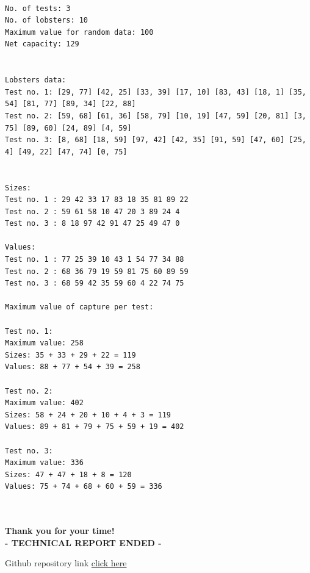 \documentclass{article}%
\begin{document}
\small
\begin{verbatim}                     
    
No. of tests: 3
No. of lobsters: 10
Maximum value for random data: 100
Net capacity: 129


Lobsters data:
Test no. 1: [29, 77] [42, 25] [33, 39] [17, 10] [83, 43] [18, 1] [35, 54] [81, 77] [89, 34] [22, 88] 
Test no. 2: [59, 68] [61, 36] [58, 79] [10, 19] [47, 59] [20, 81] [3, 75] [89, 60] [24, 89] [4, 59] 
Test no. 3: [8, 68] [18, 59] [97, 42] [42, 35] [91, 59] [47, 60] [25, 4] [49, 22] [47, 74] [0, 75] 


Sizes:
Test no. 1 : 29 42 33 17 83 18 35 81 89 22 
Test no. 2 : 59 61 58 10 47 20 3 89 24 4 
Test no. 3 : 8 18 97 42 91 47 25 49 47 0 

Values:
Test no. 1 : 77 25 39 10 43 1 54 77 34 88 
Test no. 2 : 68 36 79 19 59 81 75 60 89 59 
Test no. 3 : 68 59 42 35 59 60 4 22 74 75 

Maximum value of capture per test:

Test no. 1:
Maximum value: 258
Sizes: 35 + 33 + 29 + 22 = 119
Values: 88 + 77 + 54 + 39 = 258

Test no. 2:
Maximum value: 402
Sizes: 58 + 24 + 20 + 10 + 4 + 3 = 119
Values: 89 + 81 + 79 + 75 + 59 + 19 = 402

Test no. 3:
Maximum value: 336
Sizes: 47 + 47 + 18 + 8 = 120
Values: 75 + 74 + 68 + 60 + 59 = 336
    
                        
    \end{verbatim}                    
\vspace*{\fill}
%
\newpage%

        \vspace*{\fill}
        \begin{center}
            \LARGE \textbf{Thank you for your time!} \\
            \LARGE \textbf{- TECHNICAL REPORT ENDED -}
        \end{center}
                 
        \vspace*{\fill}
Github repository link %
\href{https://github.com/necsulea-andrei-ace-ucv/TEMA_DE_CASA_AD}{click here}%
\end{document}
